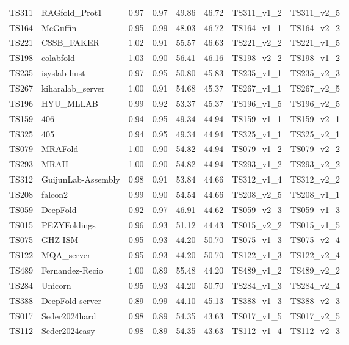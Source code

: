 \begin{longtable}{llllllll}
TS311 & RAGfold\_Prot1 & 0.97 & 0.97 & 49.86 & 46.72 & TS311\_v1\_2 & TS311\_v2\_5 \\ 
TS164 & McGuffin & 0.95 & 0.99 & 48.03 & 46.72 & TS164\_v1\_1 & TS164\_v2\_2 \\ 
TS221 & CSSB\_FAKER & 1.02 & 0.91 & 55.57 & 46.63 & TS221\_v2\_2 & TS221\_v1\_5 \\ 
TS198 & colabfold & 1.03 & 0.90 & 56.41 & 46.16 & TS198\_v2\_2 & TS198\_v1\_2 \\ 
TS235 & isyslab-hust & 0.97 & 0.95 & 50.80 & 45.83 & TS235\_v1\_1 & TS235\_v2\_3 \\ 
TS267 & kiharalab\_server & 1.00 & 0.91 & 54.68 & 45.37 & TS267\_v1\_1 & TS267\_v2\_5 \\ 
TS196 & HYU\_MLLAB & 0.99 & 0.92 & 53.37 & 45.37 & TS196\_v1\_5 & TS196\_v2\_5 \\ 
TS159 & 406 & 0.94 & 0.95 & 49.34 & 44.94 & TS159\_v1\_1 & TS159\_v2\_1 \\ 
TS325 & 405 & 0.94 & 0.95 & 49.34 & 44.94 & TS325\_v1\_1 & TS325\_v2\_1 \\ 
TS079 & MRAFold & 1.00 & 0.90 & 54.82 & 44.94 & TS079\_v1\_2 & TS079\_v2\_2 \\ 
TS293 & MRAH & 1.00 & 0.90 & 54.82 & 44.94 & TS293\_v1\_2 & TS293\_v2\_2 \\ 
TS312 & GuijunLab-Assembly & 0.98 & 0.91 & 53.84 & 44.66 & TS312\_v1\_4 & TS312\_v2\_2 \\ 
TS208 & falcon2 & 0.99 & 0.90 & 54.54 & 44.66 & TS208\_v2\_5 & TS208\_v1\_1 \\ 
TS059 & DeepFold & 0.92 & 0.97 & 46.91 & 44.62 & TS059\_v2\_3 & TS059\_v1\_3 \\ 
TS015 & PEZYFoldings & 0.96 & 0.93 & 51.12 & 44.43 & TS015\_v2\_2 & TS015\_v1\_5 \\ 
TS075 & GHZ-ISM & 0.95 & 0.93 & 44.20 & 50.70 & TS075\_v1\_3 & TS075\_v2\_4 \\ 
TS122 & MQA\_server & 0.95 & 0.93 & 44.20 & 50.70 & TS122\_v1\_3 & TS122\_v2\_4 \\ 
TS489 & Fernandez-Recio & 1.00 & 0.89 & 55.48 & 44.20 & TS489\_v1\_2 & TS489\_v2\_2 \\ 
TS284 & Unicorn & 0.95 & 0.93 & 44.20 & 50.70 & TS284\_v1\_3 & TS284\_v2\_4 \\ 
TS388 & DeepFold-server & 0.89 & 0.99 & 44.10 & 45.13 & TS388\_v1\_3 & TS388\_v2\_3 \\ 
TS017 & Seder2024hard & 0.98 & 0.89 & 54.35 & 43.63 & TS017\_v1\_5 & TS017\_v2\_5 \\ 
TS112 & Seder2024easy & 0.98 & 0.89 & 54.35 & 43.63 & TS112\_v1\_4 & TS112\_v2\_3 \\ 

\end{longtable}
